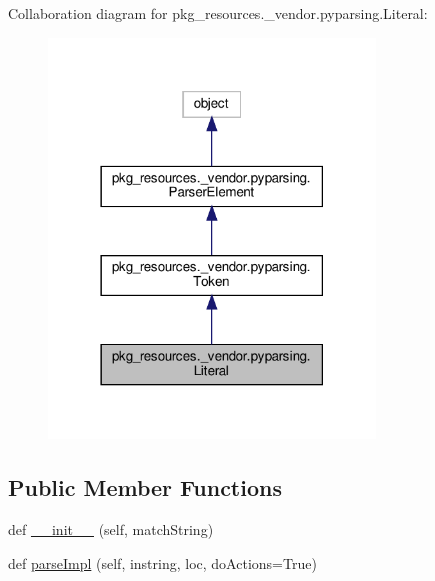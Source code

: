 Collaboration diagram for pkg\+\_\+resources.\+\_\+vendor.\+pyparsing.\+Literal\+:
\nopagebreak
\begin{figure}[H]
\begin{center}
\leavevmode
\includegraphics[width=246pt]{classpkg__resources_1_1__vendor_1_1pyparsing_1_1Literal__coll__graph}
\end{center}
\end{figure}
\subsection*{Public Member Functions}
\begin{DoxyCompactItemize}
\item 
def \hyperlink{classpkg__resources_1_1__vendor_1_1pyparsing_1_1Literal_a84998933148a451f733fc5c60058f6ad}{\+\_\+\+\_\+init\+\_\+\+\_\+} (self, match\+String)
\item 
def \hyperlink{classpkg__resources_1_1__vendor_1_1pyparsing_1_1Literal_a9cfffbc7224a82b98c5ee7bbdce631e0}{parse\+Impl} (self, instring, loc, do\+Actions=True)
\end{DoxyCompactItemize}
